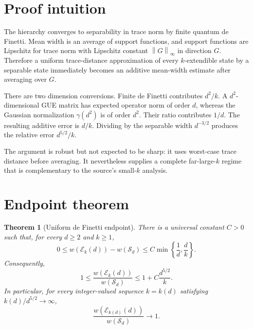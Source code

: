 \documentclass[11pt]{article}
\newtheorem{theorem}{Theorem}
\newcommand{\Eset}{\mathcal E}
\newcommand{\Sep}{\mathcal S}
\newcommand{\norm}[1]{\left\lVert#1\right\rVert}
\begin{document}
\section{Proof intuition}

The hierarchy converges to separability in trace norm by finite quantum de Finetti.  Mean width is an average of support functions, and support functions are Lipschitz for trace norm with Lipschitz constant $\norm{G}_\infty$ in direction $G$.  Therefore a uniform trace-distance approximation of every $k$-extendible state by a separable state immediately becomes an additive mean-width estimate after averaging over $G$.

There are two dimension conversions.  Finite de Finetti contributes $d^2/k$.  A $d^2$-dimensional GUE matrix has expected operator norm of order $d$, whereas the Gaussian normalization $\gamma(d^2)$ is of order $d^2$.  Their ratio contributes $1/d$.  The resulting additive error is $d/k$.  Dividing by the separable width $d^{-3/2}$ produces the relative error $d^{5/2}/k$.

The argument is robust but not expected to be sharp: it uses worst-case trace distance before averaging.  It nevertheless supplies a complete far-large-$k$ regime that is complementary to the source's small-$k$ analysis.

\section{Endpoint theorem}

\begin{theorem}[Uniform de Finetti endpoint]\label{thm:endpoint}
There is a universal constant $C>0$ such that, for every $d\geq2$ and $k\geq1$,
\begin{equation}\label{eq:additive}
 0\leq w(\Eset_k(d))-w(\Sep_d)
 \leq C\min\left\{\frac1d,\frac d k\right\}.
\end{equation}
Consequently,
\begin{equation}\label{eq:relative}
 1\leq \frac{w(\Eset_k(d))}{w(\Sep_d)}
 \leq 1+C\frac{d^{5/2}}{k}.
\end{equation}
In particular, for every integer-valued sequence $k=k(d)$ satisfying
$k(d)/d^{5/2}\to\infty$,
\[
 \frac{w(\Eset_{k(d)}(d))}{w(\Sep_d)}\longrightarrow1.
\]
\end{theorem}
\end{document}
